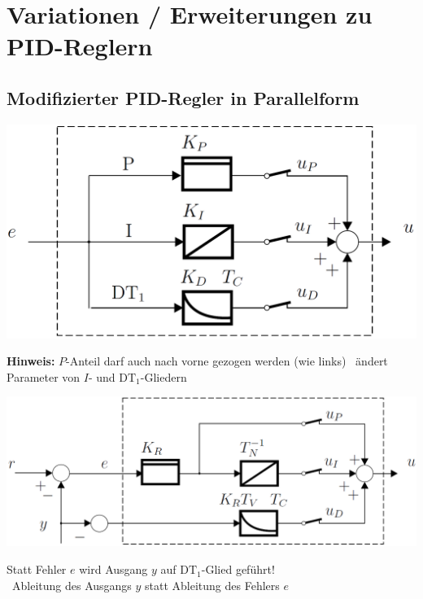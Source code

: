 \section{Variationen / Erweiterungen zu PID-Reglern}

\subsection{Modifizierter PID-Regler in Parallelform}

\begin{minipage}[t]{0.4\columnwidth}
    \begin{center}
        \textbf{}
    \end{center}
    \includegraphics[width=\columnwidth]{images/pid_regler_aufbau.png}

    \textbf{Hinweis:} $P$-Anteil darf auch nach vorne gezogen werden (wie links) 
    \textrightarrow\ ändert Parameter von $I$- und $\text{DT}_1$-Gliedern
\end{minipage}
\hfill
\begin{minipage}[t]{0.55\columnwidth}
    \begin{center}
        \textbf{}
    \end{center}
    \includegraphics[width=\columnwidth]{images/modifizierter_pid_regler.png}

    Statt Fehler $e$ wird Ausgang $y$ auf $\text{DT}_1$-Glied geführt! \\
    \textrightarrow\ Ableitung des Ausgangs $y$ statt Ableitung des Fehlers $e$
\end{minipage}


